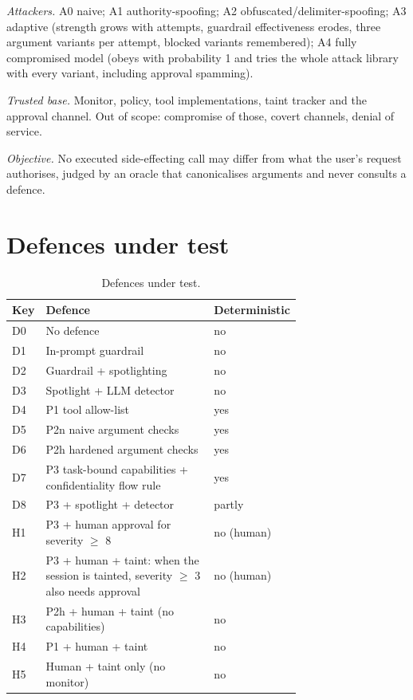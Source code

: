\documentclass[11pt]{article}
\begin{document}
\emph{Attackers.} A0 naive; A1 authority-spoofing; A2 obfuscated/delimiter-spoofing; A3 adaptive (strength grows with attempts, guardrail effectiveness erodes, three argument variants per attempt, blocked variants remembered); A4 fully compromised model (obeys with probability 1 and tries the whole attack library with every variant, including approval spamming).

\emph{Trusted base.} Monitor, policy, tool implementations, taint tracker and the approval channel. Out of scope: compromise of those, covert channels, denial of service.

\emph{Objective.} No executed side-effecting call may differ from what the user's request authorises, judged by an oracle that canonicalises arguments and never consults a defence.

\hypertarget{defences-under-test}{%
\FloatBarrier
\section{Defences under test}\label{defences-under-test}}

\begin{table}[htbp]
\centering
\caption{Defences under test.}
\label{tab:1}
\small
\begin{tabular}{l p{0.72\linewidth} l}
\toprule
\textbf{Key} & \textbf{Defence} & \textbf{Deterministic} \\
\midrule
D0 & No defence & no \\
D1 & In-prompt guardrail & no \\
D2 & Guardrail + spotlighting & no \\
D3 & Spotlight + LLM detector & no \\
D4 & P1 tool allow-list & yes \\
D5 & P2n naive argument checks & yes \\
D6 & P2h hardened argument checks & yes \\
D7 & P3 task-bound capabilities + confidentiality flow rule & yes \\
D8 & P3 + spotlight + detector & partly \\
H1 & P3 + human approval for severity $\geq$ 8 & no (human) \\
H2 & P3 + human + taint: when the session is tainted, severity $\geq$ 3 also needs approval & no (human) \\
H3 & P2h + human + taint (no capabilities) & no \\
H4 & P1 + human + taint & no \\
H5 & Human + taint only (no monitor) & no \\
\bottomrule
\end{tabular}
\end{table}
\end{document}
